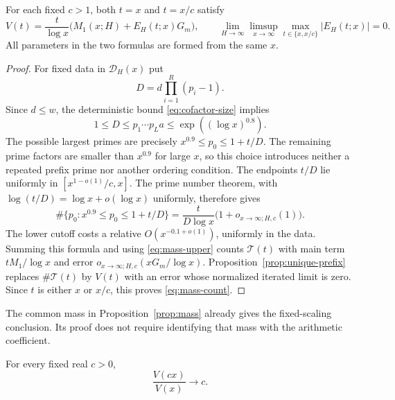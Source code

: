 \begin{proposition}
\label{prop:mass}
For each fixed $c>1$, both $t=x$ and $t=x/c$ satisfy
\begin{equation}
 V(t)=\frac{t}{\log x}
 \bigl(M_1(x;H)+E_H(t;x)G_m\bigr),
 \qquad
 \lim_{H\to\infty}\limsup_{x\to\infty}
 \max_{t\in\{x,x/c\}}|E_H(t;x)|=0.
 \label{eq:mass-count}
\end{equation}
All parameters in the two formulas are formed from the same $x$.
\end{proposition}

\begin{proof}
For fixed data in $\mathcal D_H(x)$ put
\[
 D=d\prod_{i=1}^R(p_i-1).
\]
Since $d\le w$, the deterministic bound \eqref{eq:cofactor-size}
implies
\[
 1\le D\le p_1\cdots p_La\le\exp((\log x)^{0.8}).
\]
The possible largest primes are precisely
$x^{0.9}\le p_0\le 1+t/D$.  The remaining prime factors are smaller
than $x^{0.9}$ for large $x$, so this choice introduces neither a
repeated prefix prime nor another ordering condition.  The endpoints
$t/D$ lie uniformly in $[x^{1-o(1)}/c,x]$.  The prime number theorem,
with $\log(t/D)=\log x+o(\log x)$ uniformly, therefore gives
\[
 \#\{p_0:x^{0.9}\le p_0\le1+t/D\}
 =\frac{t}{D\log x}\bigl(1+o_{x\to\infty;H,c}(1)\bigr).
\]
The lower cutoff costs a relative
$O(x^{-0.1+o(1)})$, uniformly in the data.  Summing this formula and
using \eqref{eq:mass-upper} counts $\mathcal T(t)$ with main term
$tM_1/\log x$ and error $o_{x\to\infty;H,c}(xG_m/\log x)$.
Proposition~\ref{prop:unique-prefix} replaces $\#\mathcal T(t)$ by
$V(t)$ with an error whose normalized iterated limit is zero.  Since
$t$ is either $x$ or $x/c$, this proves \eqref{eq:mass-count}.
\end{proof}

The common mass in Proposition~\ref{prop:mass} already gives the
fixed-scaling conclusion. Its proof does not require identifying that
mass with the arithmetic coefficient.

\begin{corollary}\label{cor:fixed-scaling}
For every fixed real \(c>0\),
\[
 \frac{V(cx)}{V(x)}\longrightarrow c.
\]
\end{corollary}

